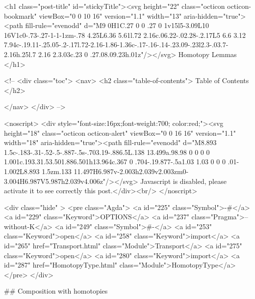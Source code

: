   <h1 class="post-title" id="stickyTitle"><svg height="22" class="octicon octicon-bookmark" viewBox="0 0 10 16" version="1.1" width="13" aria-hidden="true"><path fill-rule="evenodd" d="M9 0H1C.27 0 0 .27 0 1v15l5-3.09L10 16V1c0-.73-.27-1-1-1zm-.78 4.25L6.36 5.61l.72 2.16c.06.22-.02.28-.2.17L5 6.6 3.12 7.94c-.19.11-.25.05-.2-.17l.72-2.16-1.86-1.36c-.17-.16-.14-.23.09-.23l2.3-.03.7-2.16h.25l.7 2.16 2.3.03c.23 0 .27.08.09.23h.01z"/></svg> Homotopy Lemmas
  </h1>

  <!-- 
  <div class="toc">
    <nav>
    <h2 class="table-of-contents"> Table of Contents </h2>
      

    </nav>
  </div>
   -->

  <noscript>
  <div style="font-size:16px;font-weight:700; color:red;"><svg height="18" class="octicon octicon-alert" viewBox="0 0 16 16" version="1.1" width="18" aria-hidden="true"><path fill-rule="evenodd" d="M8.893 1.5c-.183-.31-.52-.5-.887-.5s-.703.19-.886.5L.138 13.499a.98.98 0 0 0 0 1.001c.193.31.53.501.886.501h13.964c.367 0 .704-.19.877-.5a1.03 1.03 0 0 0 .01-1.002L8.893 1.5zm.133 11.497H6.987v-2.003h2.039v2.003zm0-3.004H6.987V5.987h2.039v4.006z"/></svg> Javascript is disabled, please activate it to see correctly this post.</div><br/>
  </noscript>

  <div class="hide" >
<pre class="Agda">
<a id="225" class="Symbol">{-#</a> <a id="229" class="Keyword">OPTIONS</a> <a id="237" class="Pragma">--without-K</a> <a id="249" class="Symbol">#-}</a>
<a id="253" class="Keyword">open</a> <a id="258" class="Keyword">import</a> <a id="265" href="Transport.html" class="Module">Transport</a>
<a id="275" class="Keyword">open</a> <a id="280" class="Keyword">import</a> <a id="287" href="HomotopyType.html" class="Module">HomotopyType</a>
</pre>
</div>

## Composition with homotopies

